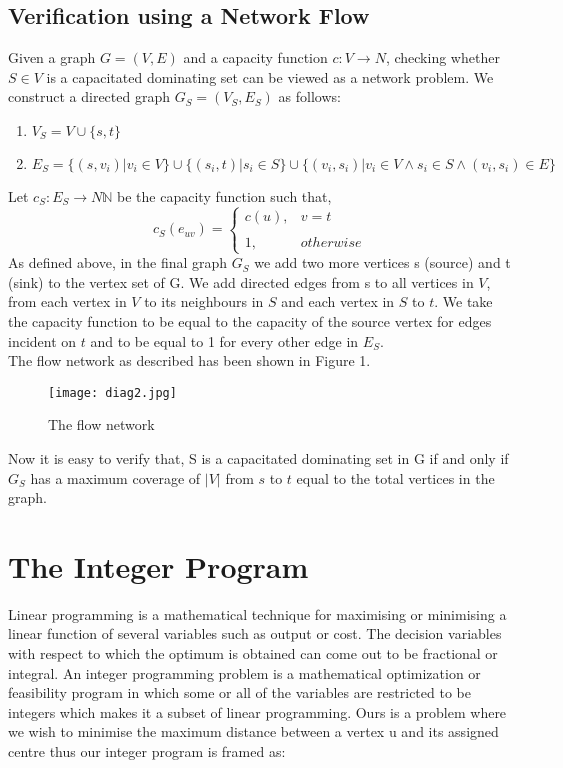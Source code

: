 \documentclass[12pt,a4paper,onecolumn]{article}
\begin{document}
\subsection{Verification using a Network Flow }
Given a graph $G = (V,E)$ and a capacity function $c : V \rightarrow N$, checking whether $S \in V$ is a capacitated dominating set can be viewed as a network problem. We construct a directed graph $G_S = (V_S,E_S)$ as follows:\begin{enumerate} 
\item $V_S = V \cup \{s,t\}$
\item $E_S = \{(s,v_i) | v_i \in V \} \cup \{(s_i,t) | s_i \in S \}\cup \{(v_i,s_i) | v_i \in V \wedge s_i \in S \wedge (v_i,s_i) \in E \}$\end{enumerate} Let $c_S : E_S \rightarrow N\mathbb{N}$ be the capacity function such that, $$c_S(e_{uv}) =\left\{ \begin{array}{cc}c(u),  &  v = t \\\\ 1, & otherwise \end{array}\right.$$
As defined above, in the final graph $G_S$ we add two more vertices s (source) and t (sink) to the vertex set of G. We add directed edges from s to all vertices in $V$, from each vertex in $V$ to its neighbours in $S$ and each vertex in $S$ to $t$. We take the capacity function to be equal to the capacity of the source vertex for edges incident on $t$ and to be equal to 1 for every other edge in $E_S$. \\
The flow network as described has been shown in Figure 1.
\begin{flushleft}
 \begin{figure}[H]
 \begin{center}
 \texttt{[image: diag2.jpg]}
 \end{center}
  \caption{The flow network}
  \label{Figure 1}
\end{figure}
\end{flushleft}
  Now it is easy to verify that, S is a capacitated dominating set in G if and only if $G_S$ has a maximum coverage of $|V|$ from $s$ to $t$ equal to the total vertices in the graph. 

\section{The Integer Program}
Linear programming is a mathematical technique for maximising or minimising a linear function of several variables such as output or cost. The decision variables with respect to which the optimum is obtained can come out to be fractional or integral. An integer programming problem is a mathematical optimization or feasibility program in which
some or all of the variables are restricted to be integers which makes it a subset of linear programming. Ours is a problem where we
wish to minimise the maximum distance between a vertex u and its assigned centre thus our integer program is framed as:
\\
\end{document}
